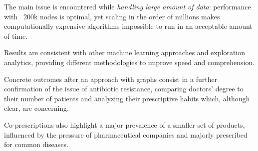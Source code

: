 The main issue is encountered while \textit{handling large amount of data}: performance with ~200k nodes is optimal, yet scaling in the order of millions makes computationally expensive algorithms impossible to run in an acceptable amount of time.

Results are consistent with other machine learning approaches and exploration analytics, providing different methodologies to improve speed and comprehension.

Concrete outcomes after an approach with graphs consist in a further confirmation of the issue of antibiotic resistance, comparing doctors' degree to their number of patients and analyzing their prescriptive habits which, although clear, are concerning.

Co-prescriptions also highlight a major prevalence of a smaller set of products, influenced by the pressure of pharmaceutical companies and majorly prescribed for common diseases. 

